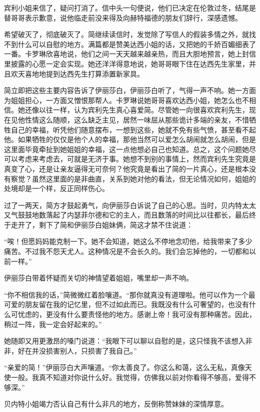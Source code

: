 \par 宾利小姐来信了，疑问打消了。信中头一句便说，他们已决定在伦敦过冬，结尾是替哥哥表示歉意，说他临走前没来得及向赫特福德的朋友们辞行，深感遗憾。
\par 希望破灭了，彻底破灭了。简继续读信时，发觉除了写信人的假装多情之外，就找不到什么可以自慰的地方。满篇都是赞美达西小姐的话，又把她的千娇百媚细表了一番。卡罗琳欣喜地说，他们之间一天天越来越亲热，而且大胆地预言，她上封信里披露的心愿一定会实现。她还洋洋得意地说，她哥哥眼下住在达西先生家里，并且欢天喜地地提到达西先生打算添置新家具。
\par 简立即把这些主要内容告诉了伊丽莎白，伊丽莎白听了，气得一声不响。她一方面为姐姐担心，一方面又憎恨那帮人。卡罗琳说她哥哥喜欢达西小姐，她怎么也不相信。她还像以往一样，认为宾利先生真心喜爱简。尽管她一向很喜欢宾利先生，现在见他性情这么随顺，这么缺乏主见，居然一味屈从那些诡计多端的亲友，不惜牺牲自己的幸福，听凭他们随意摆布，一想到这些，她就不免有些气愤，甚至看不起他。如果牺牲的仅仅是他个人的幸福，那他当然可以爱怎么胡闹就怎么胡闹，但是这里面毕竟牵扯到她姐姐的幸福，这一点他想必自己也知道。总之，这个问题她尽可以考虑来考虑去，可就是无济于事。她想不到别的事情上，然而宾利先生究竟是真变了心，还是让亲友逼得无可奈何？他究竟是看出了简的一片真心，还是根本没有察觉？虽然这里面的是非曲直，关系到她对他的看法，但无论情况如何，姐姐的处境却是一个样，反正同样伤心。
\par 过了一两天，简方才鼓起勇气，向伊丽莎白诉说了自己的心思。当时，贝内特太太又气鼓鼓地数落起了内瑟菲尔德和它的主人，而且数落的时间比以往都长，最后终于走开了，剩下了简和伊丽莎白姐妹俩，简这才禁不住说道：
\par “唉！但愿妈妈能克制一下。她不会知道，她这么不停地念叨他，给我带来了多少痛苦。不过我不怨天尤人。这种情况是不会长久的。我们会忘掉他的，一切都和以前一样。”
\par 伊丽莎白带着怀疑而关切的神情望着姐姐，嘴里却一声不响。
\par “你不相信我的话，”简微微红着脸嚷道。“那你就真没有道理啦。他可以作为一个最可爱的朋友留在我的记忆里，但不过如此而已。我既没有什么可奢望的，也没有什么可忧虑的，更没有什么要责怪他的地方。感谢上帝！我可没有那种痛苦。因此，稍过一阵，我一定会好起来的。”
\par 她随即又用更激昂的嗓门说道：“我眼下可以聊以自慰的是，这只怪我不该想入非非，好在并没损害别人，只损害了我自己。”
\par “亲爱的简！”伊丽莎白大声嚷道。“你太善良了。你这么和蔼，这么无私，真像天使一般。我真不知道对你说什么好。我觉得，仿佛我以前对你看得不够高，爱得不够深。”
\par 贝内特小姐竭力否认自己有什么非凡的地方，反倒称赞妹妹的深情厚意。
